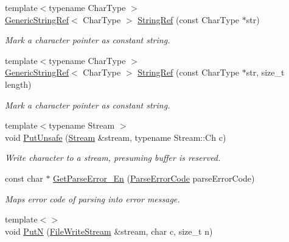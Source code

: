 \begin{DoxyCompactItemize}
\item 
{\footnotesize template$<$typename Char\+Type $>$ }\\\mbox{\hyperlink{structrapidjson_1_1_generic_string_ref}{Generic\+String\+Ref}}$<$ Char\+Type $>$ \mbox{\hyperlink{namespacerapidjson_aa6b9fd9f6aa49405a574c362ba9af6b5}{String\+Ref}} (const Char\+Type $\ast$str)
\begin{DoxyCompactList}\small\item\em Mark a character pointer as constant string. \end{DoxyCompactList}\item 
{\footnotesize template$<$typename Char\+Type $>$ }\\\mbox{\hyperlink{structrapidjson_1_1_generic_string_ref}{Generic\+String\+Ref}}$<$ Char\+Type $>$ \mbox{\hyperlink{namespacerapidjson_a578c51ab574a50a9c760b9da7c7562f2}{String\+Ref}} (const Char\+Type $\ast$str, size\+\_\+t length)
\begin{DoxyCompactList}\small\item\em Mark a character pointer as constant string. \end{DoxyCompactList}\item 
{\footnotesize template$<$typename Stream $>$ }\\void \mbox{\hyperlink{namespacerapidjson_a0a774dcffe8ae07686f459ae017d2f20}{Put\+Unsafe}} (\mbox{\hyperlink{classrapidjson_1_1_stream}{Stream}} \&stream, typename Stream\+::\+Ch c)
\begin{DoxyCompactList}\small\item\em Write character to a stream, presuming buffer is reserved. \end{DoxyCompactList}\item 
const char $\ast$ \mbox{\hyperlink{group___r_a_p_i_d_j_s_o_n___e_r_r_o_r_s_gae982013498511a0ef3c2a3d2069adb4f}{Get\+Parse\+Error\+\_\+\+En}} (\mbox{\hyperlink{group___r_a_p_i_d_j_s_o_n___e_r_r_o_r_s_ga7d3acf640886b1f2552dc8c4cd6dea60}{Parse\+Error\+Code}} parse\+Error\+Code)
\begin{DoxyCompactList}\small\item\em Maps error code of parsing into error message. \end{DoxyCompactList}\item 
{\footnotesize template$<$$>$ }\\void \mbox{\hyperlink{namespacerapidjson_a1ac13bac5976fc06587e00fc0bcfb32a}{PutN}} (\mbox{\hyperlink{classrapidjson_1_1_file_write_stream}{File\+Write\+Stream}} \&stream, char c, size\+\_\+t n)

\end{DoxyCompactItemize}
